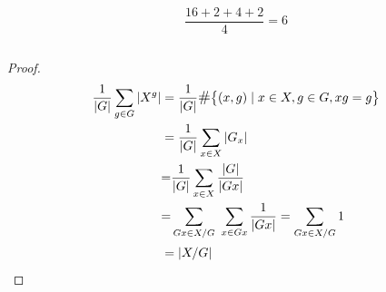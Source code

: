 \documentclass[standalone]{beamer}
\begin{document}
\begin{frame}
\begin{columns}
\begin{column}{0.4\textwidth}
      \[ \frac{16 + 2 + 4 + 2}{4} = 6 \]
    \end{column}
  \end{columns}
\end{frame}

\begin{frame}
  \begin{proof}
  \begin{align*}
   \frac{1}{\abs{G}} \sum_{g \in G} \abs{X^g} &= \frac{1}{\abs{G}}
   \sharp \big\{ (x, g) \mid x \in X, g \in G, x g = g \big\} \\
   &= \frac{1}{\abs{G}} \sum_{x \in X} \abs{G_x} \\
   &{=} \frac{1}{\abs{G}} \sum_{x \in X} \frac{\abs{G}}{\abs{Gx}}\\
   &{=} \sum_{Gx \in X / G} \ \sum_{x \in Gx} \frac{1}{\abs{Gx}} = \sum_{Gx \in X/G} 1\\
   &= \abs{X / G}
  \end{align*}
  \end{proof}
\end{frame}
\end{document}
